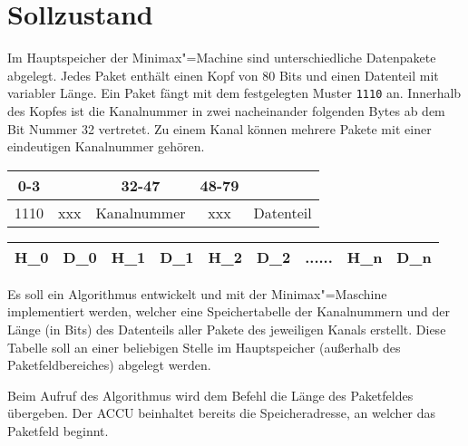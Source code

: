 \chapter{Sollzustand}
\label{chapter:Pflichtenheft-Sollzustand}

Im Hauptspeicher der Minimax"=Machine sind unterschiedliche Datenpakete abgelegt. Jedes Paket enthält einen Kopf von 80 Bits und einen Datenteil mit variabler Länge. Ein Paket fängt mit dem festgelegten Muster \texttt{1110} an. Innerhalb des Kopfes ist die Kanalnummer in zwei nacheinander folgenden Bytes ab dem Bit Nummer 32 vertretet. Zu einem Kanal können mehrere Pakete mit einer eindeutigen Kanalnummer gehören.

\begin{center}
    \begin{tabular}{|c|c|c|c|c|}
        \multicolumn{1}{c}{0-3} & \multicolumn{1}{c}{} & \multicolumn{1}{c}{32-47} & \multicolumn{1}{c}{48-79} & \multicolumn{1}{c}{} \\
        \hline
        1110 & xxx & Kanalnummer & xxx & \hspace{1cm} Datenteil \hspace{1cm} \\
        \hline
    \end{tabular}
\end{center}

\begin{center}
    \begin{tabular}{|c|c|c|c|c|c|c|c|c|}
        \hline
        H_0 & \hspace{.3cm} D_0 \hspace*{.3cm} & H_1 & D_1 & H_2 & \hspace{1cm} D_2 \hspace*{1cm} & ...... & H_n & D_n \\
        \hline
    \end{tabular}
\end{center}

Es soll ein Algorithmus entwickelt und mit der Minimax"=Maschine implementiert werden, welcher eine Speichertabelle der Kanalnummern und der Länge (in Bits) des Datenteils aller Pakete des jeweiligen Kanals erstellt. Diese Tabelle soll an einer beliebigen Stelle im Hauptspeicher (außerhalb des Paketfeldbereiches) abgelegt werden.

Beim Aufruf des Algorithmus wird dem Befehl die Länge des Paketfeldes übergeben. Der ACCU beinhaltet bereits die Speicheradresse, an welcher das Paketfeld beginnt.
